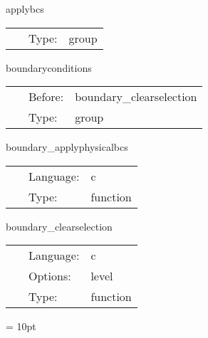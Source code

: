 \vspace{5mm}

\noindent {\bf } 

\hspace{5mm} applybcs 

\hspace{5mm}{\it apply boundary conditions } 


\hspace{5mm}

 \begin{tabular*}{160mm}{cll} 
~ & Type:  & group \\ 
\end{tabular*} 


\vspace{5mm}


\hspace{5mm} boundaryconditions 

\hspace{5mm}{\it execute all boundary conditions } 


\hspace{5mm}

 \begin{tabular*}{160mm}{cll} 
~ & Before:  & boundary\_clearselection \\ 
~ & Type:  & group \\ 
\end{tabular*} 


\vspace{5mm}


\hspace{5mm} boundary\_applyphysicalbcs 

\hspace{5mm}{\it apply all requested local physical boundary conditions } 


\hspace{5mm}

 \begin{tabular*}{160mm}{cll} 
~ & Language:  & c \\ 
~ & Type:  & function \\ 
\end{tabular*} 


\vspace{5mm}


\hspace{5mm} boundary\_clearselection 

\hspace{5mm}{\it unselect all grid variables for boundary conditions } 


\hspace{5mm}

 \begin{tabular*}{160mm}{cll} 
~ & Language:  & c \\ 
~ & Options:  & level \\ 
~ & Type:  & function \\ 
\end{tabular*} 



\vspace{5mm}\parskip = 10pt 
